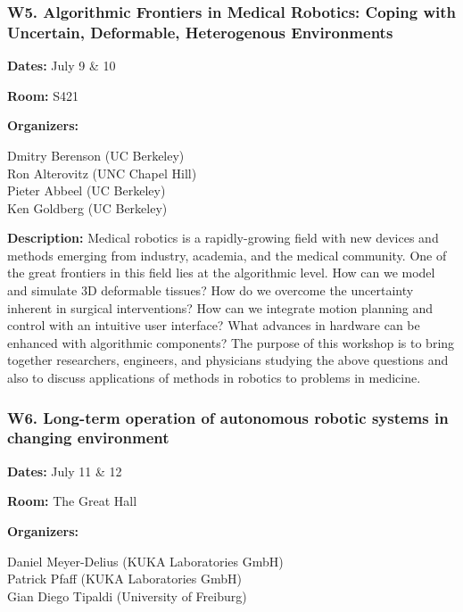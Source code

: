 \clearpage

\subsubsection*{ W5.   Algorithmic Frontiers in Medical Robotics: Coping with Uncertain, Deformable, Heterogenous Environments}

{\bf Dates:} July 9 \& 10

{\bf Room:} S421

\bigskip
{\bf Organizers:}

Dmitry Berenson (UC Berkeley)\\
Ron Alterovitz (UNC Chapel Hill)\\
Pieter Abbeel (UC Berkeley)\\
Ken Goldberg (UC Berkeley)

\bigskip
{\bf Description:}
Medical robotics is a rapidly-growing field with new devices and methods emerging from industry, academia, and the medical community. One of the great frontiers in this field lies at the algorithmic level. How can we model and simulate 3D deformable tissues? How do we overcome the uncertainty inherent in surgical interventions? How can we integrate motion planning and control with an intuitive user interface? What advances in hardware can be enhanced with algorithmic components? The purpose of this workshop is to bring together researchers, engineers, and physicians studying the above questions and also to discuss applications of methods in robotics to problems in medicine.


\subsubsection*{W6.   Long-term operation of autonomous robotic systems in changing environment}

{\bf Dates:} July 11 \& 12

{\bf Room:} The Great Hall

\bigskip
{\bf Organizers:}

Daniel Meyer-Delius (KUKA Laboratories GmbH)\\
Patrick Pfaff (KUKA Laboratories GmbH)\\
Gian Diego Tipaldi (University of Freiburg)

